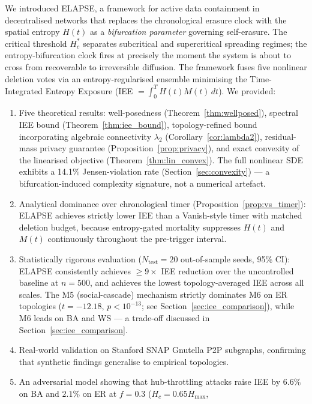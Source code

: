 \documentclass[review,12pt]{elsarticle}
\newcommand{\Hc}{H_c}
\newcommand{\Hmax}{H_{\max}}
\begin{document}
We introduced ELAPSE, a framework for active data containment in
decentralised networks that replaces the chronological erasure clock with
the spatial entropy $H(t)$ as a \emph{bifurcation parameter} governing
self-erasure. The critical threshold $\Hc^*$ separates subcritical and
supercritical spreading regimes; the entropy-bifurcation clock fires at
precisely the moment the system is about to cross from recoverable to
irreversible diffusion. The framework fuses five nonlinear deletion votes
via an entropy-regularised ensemble minimising the Time-Integrated Entropy
Exposure (IEE $= \int_0^T H(t)M(t)\,dt$). We provided:
\begin{enumerate}
  \item Five theoretical results: well-posedness (Theorem~\ref{thm:wellposed}),
        spectral IEE bound (Theorem~\ref{thm:iee_bound}), topology-refined
        bound incorporating algebraic connectivity $\lambda_2$
        (Corollary~\ref{cor:lambda2}), residual-mass privacy guarantee
        (Proposition~\ref{prop:privacy}), and exact convexity of the
        linearised objective (Theorem~\ref{thm:lin_convex}).
        The full nonlinear SDE exhibits a 14.1\% Jensen-violation rate
        (Section~\ref{sec:convexity}) --- a bifurcation-induced complexity
        signature, not a numerical artefact.
  \item Analytical dominance over chronological timer (Proposition~\ref{prop:vs_timer}):
        ELAPSE achieves strictly lower IEE than a Vanish-style timer with
        matched deletion budget, because entropy-gated mortality suppresses
        $H(t)$ and $M(t)$ continuously throughout the pre-trigger interval.
  \item Statistically rigorous evaluation ($N_{\mathrm{test}}=20$ out-of-sample
        seeds, 95\% CI): ELAPSE consistently achieves $\geq 9\times$ IEE
        reduction over the uncontrolled baseline at $n=500$, and achieves the
        lowest topology-averaged IEE across all scales.  The M5 (social-cascade)
        mechanism strictly dominates M6 on ER topologies
        ($t=-12.18$, $p<10^{-13}$; see Section~\ref{sec:iee_comparison}),
        while M6 leads on BA and WS — a trade-off discussed in
        Section~\ref{sec:iee_comparison}.
  \item Real-world validation on Stanford SNAP Gnutella P2P subgraphs,
        confirming that synthetic findings generalise to empirical topologies.
  \item An adversarial model showing that hub-throttling attacks raise IEE
        by $6.6\%$ on BA and $2.1\%$ on ER at $f=0.3$ ($\Hc=0.65\Hmax$,

\end{enumerate}
\end{document}

